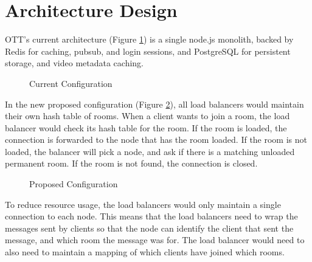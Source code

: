 \newpage

\section{Architecture Design}

OTT's current architecture (Figure \ref{Figure::old-architecture}) is a single node.js monolith, backed by Redis
for caching, pubsub, and login sessions, and PostgreSQL for persistent
storage, and video metadata caching.

\begin{figure}[htb]
  \centering
  \caption{\label{Figure::old-architecture} Current Configuration}
\end{figure}

In the new proposed configuration (Figure \ref{Figure::new-architecture}), all
load balancers would maintain their own hash table of rooms. When a client
wants to join a room, the load balancer would check its hash table for the
room. If the room is loaded, the connection is forwarded to the node that
has the room loaded. If the room is not loaded, the balancer will pick a node,
and ask if there is a matching unloaded permanent room. If the room is not found,
the connection is closed.

\begin{figure}[htb]
  \centering
{}
\caption{\label{Figure::new-architecture} Proposed Configuration}
\end{figure}

To reduce resource usage, the load balancers would only maintain a single
connection to each node. This means that the load balancers need to wrap the
messages sent by clients so that the node can identify the client that sent
the message, and which room the message was for. The load balancer would need
to also need to maintain a mapping of which clients have joined which rooms.

